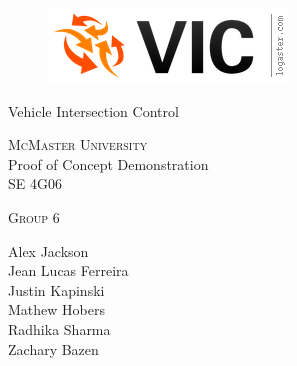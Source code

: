 \documentclass [11pt]{article}
\begin{document}
\begin {center} 

\thispagestyle{empty}
\vspace*{5cm}

\begin {figure}[h!]
\centering
\hspace{-10mm}\includegraphics [scale = .5, trim={.4cm 0 .8cm 0},clip] {figures/vic_logo.png}
\end {figure}

{\fontfamily{\cabinfamily}\selectfont
\Huge{Vehicle Intersection Control} }

\vspace{1 cm}
{\Large{\textsc{McMaster University}}\\}  \vspace {1cm}
{\large Proof of Concept Demonstration\\ \vspace {0.4 cm} SE 4G06}  \vspace {1cm}

{\large \textsc{Group 6} \\} \vspace{1cm}

{
Alex Jackson \\
Jean Lucas Ferreira \\
Justin Kapinski\\
Mathew Hobers\\
Radhika Sharma\\
Zachary Bazen}




\end{center}


\pagebreak


\tableofcontents



\pagebreak

\end{document}
